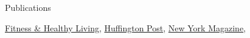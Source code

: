 \documentclass {resume}
\begin{document}
\begin{rSection}{\textrm{Publications}}
\begin{etaremune}
{\href{http://www.fitnessandhealthyliving.com/do-friends-know-how-long-youll-live/}{Fitness \& Healthy Living},
\href{http://www.huffingtonpost.com/wray-herbert/how-long-will-you-live-as_b_6184476.html}{Huffington Post},
\href{http://nymag.com/scienceofus/2014/12/will-your-personality-kill-you-ask-your-pals.html}{New York Magazine}, %
}
\end{etaremune}
\end{rSection}
\end{document}

